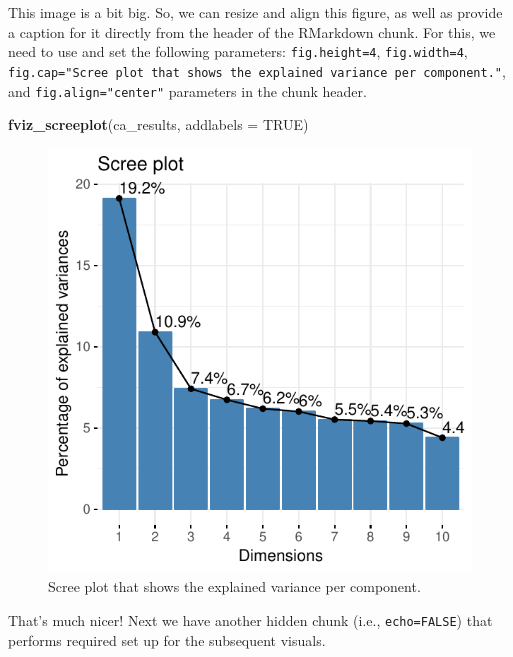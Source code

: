 \documentclass[]{article}
\newenvironment{Shaded}{\begin{snugshade}}{\end{snugshade}}
\newcommand{\DataTypeTok}[1]{\textcolor[rgb]{0.13,0.29,0.53}{#1}}
\newcommand{\KeywordTok}[1]{\textcolor[rgb]{0.13,0.29,0.53}{\textbf{#1}}}
\newcommand{\NormalTok}[1]{#1}
\newcommand{\OtherTok}[1]{\textcolor[rgb]{0.56,0.35,0.01}{#1}}
\begin{document}
This image is a bit big. So, we can resize and align this figure, as
well as provide a caption for it directly from the header of the
RMarkdown chunk. For this, we need to use and set the following
parameters: \texttt{fig.height=4}, \texttt{fig.width=4},
\texttt{fig.cap="Scree\ plot\ that\ shows\ the\ explained\ variance\ per\ component."},
and \texttt{fig.align="center"} parameters in the chunk header.

\begin{Shaded}
\begin{Highlighting}[]
\KeywordTok{fviz_screeplot}\NormalTok{(ca_results, }\DataTypeTok{addlabels =} \OtherTok{TRUE}\NormalTok{)}
\end{Highlighting}
\end{Shaded}

\begin{figure}[H]

{\centering \includegraphics{1_b_Simple_RMarkdown_PDF_files/figure-latex/visualize_ca_scree_chunk_parameters-1} 

}

\caption{Scree plot that shows the explained variance per component.}\label{fig:visualize_ca_scree_chunk_parameters}
\end{figure}

That's much nicer! Next we have another hidden chunk (i.e.,
\texttt{echo=FALSE}) that performs required set up for the subsequent
visuals.
\end{document}
